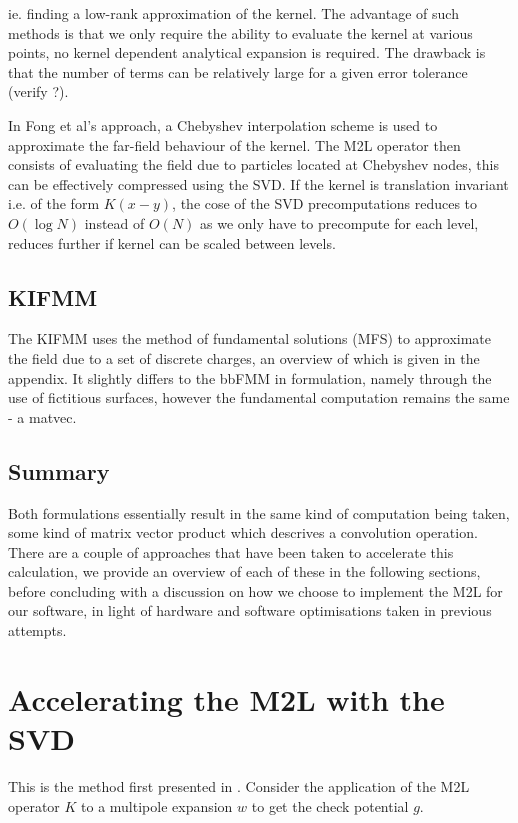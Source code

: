 \documentclass[12pt, a4, twoside]{article}
\begin{document}
ie. finding a low-rank approximation of the kernel. The advantage of such methods is that we only require the ability to evaluate the kernel at various points, no kernel dependent analytical expansion is required. The drawback is that the number of terms can be relatively large for a given error tolerance (verify ?).

In Fong et al's approach, a Chebyshev interpolation scheme is used to approximate the far-field behaviour of the kernel. The M2L operator then consists of evaluating the field due to particles located at Chebyshev nodes, this can be effectively compressed using the SVD. If the kernel is translation invariant i.e. of the form $K(x-y)$, the cose of the SVD precomputations reduces to $O(\log N)$ instead of $O(N)$ as we only have to precompute for each level, reduces further if kernel can be scaled between levels.

\subsection{KIFMM}

The KIFMM uses the method of fundamental solutions (MFS) to approximate the field due to a set of discrete charges, an overview of which is given in the appendix. It slightly differs to the bbFMM in formulation, namely through the use of fictitious surfaces, however the fundamental computation remains the same - a matvec.

\subsection{Summary}

Both formulations essentially result in the same kind of computation being taken, some kind of matrix vector product which descrives a convolution operation. There are a couple of approaches that have been taken to accelerate this calculation, we provide an overview of each of these in the following sections, before concluding with a discussion on how we choose to implement the M2L for our software, in light of hardware and software optimisations taken in previous attempts.

\section{Accelerating the M2L with the SVD}

This is the method first presented in \cite{Fong2009}. Consider the application of the M2L operator $K$ to a multipole expansion $w$ to get the check potential $g$.
\end{document}

